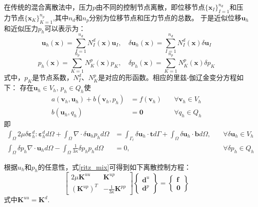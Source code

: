 在传统的混合离散法中，压力$p$由不同的控制节点离散，即位移节点$\{\boldsymbol x_I\}_{I=1}^{n_d}$和压力节点$\{\boldsymbol x_K\}_{K=1}^{n_p}$,其中$n_d$和$n_p$分别为位移节点和压力节点的总数。
于是近似位移$\boldsymbol u_h$和近似压力$p_h$可以表示为：
\begin{equation}\label{u_h_mix}
    \boldsymbol u_h(\boldsymbol x) = \sum_{I=1}^{n_d} N^d_I(\boldsymbol x) \boldsymbol u_I, \quad
    \delta \boldsymbol u_h(\boldsymbol x) = \sum_{I=1}^{n_d} N^d_I(\boldsymbol x) \delta \boldsymbol u_I
\end{equation}
\begin{equation}\label{p_h_mix}
    p_h(\boldsymbol x) = \sum_{K=1}^{n_p} N^p_K(\boldsymbol x) p_K, \quad
    \delta p_h(\boldsymbol x) = \sum_{K=1}^{n_p} N^p_K(\boldsymbol x) \delta p_K
\end{equation}
式中，$p_K$是节点系数，$N^d_I$、$N^p_K$是对应的形函数。相应的里兹-伽辽金变分方程如下：
存在$\boldsymbol u_h \in V_h$, $p_h \in Q_h$使
\begin{equation}
    \begin{aligned}
        a(\boldsymbol v_h, \boldsymbol u_h) + b(\boldsymbol v_h, p_h) &= f(\boldsymbol v_h) \quad &\forall \boldsymbol v_h \in V_h \\
        b(\boldsymbol u_h, q_h) &= \boldsymbol 0 \quad &\forall q_h \in Q_h
    \end{aligned}
\end{equation}
即
\begin{subequations}\label{ritz_mix}
\begin{alignat}{2}
\label{ritz_mix_1}
\int_\Omega 2\mu \delta \boldsymbol \varepsilon^d_h : \boldsymbol \varepsilon^d_h d\Omega +
\int_\Omega \nabla \cdot \delta \boldsymbol u_h p_h d\Omega &=
\int_{\Gamma_t} \delta \boldsymbol u_h \cdot \boldsymbol t d\Gamma + \int_\Omega \delta \boldsymbol u_h \cdot \boldsymbol b d\Omega, \quad
&\forall \delta \boldsymbol u_h \in V_h \\
\label{ritz_mix_2}
\int_\Omega \delta p_h \nabla \cdot \boldsymbol u_h d\Omega - \int_\Omega \frac{1}{3\kappa} \delta p_h p_h d\Omega &= 0, &\forall \delta p_h \in Q_h
\end{alignat}
\end{subequations}

根据$u_h$和$p_h$的任意性，式\eqref{ritz_mix}可得到如下离散控制方程：
\begin{equation}\label{equilibrium_mix}
    \begin{bmatrix}
        2\mu\boldsymbol K^{uu} & \boldsymbol K^{up} \\ (\boldsymbol K^{up})^T & -\frac{1}{3\kappa}\boldsymbol K^{pp}
    \end{bmatrix}
    \begin{Bmatrix}
        \boldsymbol d^u \\ \boldsymbol d^p 
    \end{Bmatrix} =
    \begin{Bmatrix}
        \boldsymbol f \\ \boldsymbol 0 
    \end{Bmatrix}
\end{equation}
式中$\boldsymbol K^{uu} = \boldsymbol K^d$. 

